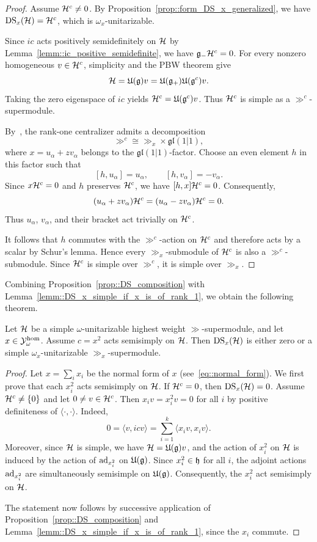 \begin{proof}
Assume ${\mathcal{H}}^c\neq0$. By Proposition~\ref{prop::form_DS_x_generalized}, we have $\operatorname{DS}_x({\mathcal{H}})={\mathcal{H}}^c$, which is $\omega_x$-unitarizable.

Since $ic$ acts positively semidefinitely on ${\mathcal{H}}$ by Lemma~\ref{lemm::ic_positive_semidefinite}, we have ${\mathfrak{g}}_-{\mathcal{H}}^{c}=0$. For every nonzero homogeneous $v\in {\mathcal{H}}^{c}$, simplicity and the PBW theorem give
\[
{\mathcal{H}}={\mathfrak U}({\mathfrak{g}})v
={\mathfrak U}({\mathfrak{g}}_+){\mathfrak U}({\mathfrak{g}}^c)v.
\]
Taking the zero eigenspace of $ic$ yields ${\mathcal{H}}^c={\mathfrak U}({\mathfrak{g}}^c)v$. Thus ${\mathcal{H}}^c$ is simple as a $\gg^c$-supermodule.

By~\cite[Theorem~3.12]{Sherman2025}, the rank-one centralizer admits a decomposition
\[
\gg^c\cong\gg_x\times\mathfrak{gl}(1\vert1),
\]
where $x=u_\alpha+zv_\alpha$ belongs to the
$\mathfrak{gl}(1\vert1)$-factor. Choose an even element
$h$ in this factor such that
\[
[h,u_\alpha]=u_\alpha,
\qquad
[h,v_\alpha]=-v_\alpha.
\]
Since $x{\mathcal{H}}^c=0$ and $h$ preserves ${\mathcal{H}}^c$, we have
$[h,x]{\mathcal{H}}^c=0$. Consequently,
\[
(u_\alpha+zv_\alpha){\mathcal{H}}^c
=
(u_\alpha-zv_\alpha){\mathcal{H}}^c=0.
\]
Thus $u_\alpha$, $v_\alpha$, and their bracket act
trivially on ${\mathcal{H}}^c$.

 
It follows that $h$ commutes with the $\gg^c$-action on ${\mathcal{H}}^c$ and therefore acts by a scalar by Schur's lemma. Hence every $\gg_x$-submodule
of ${\mathcal{H}}^c$ is also a $\gg^c$-submodule.
Since ${\mathcal{H}}^c$ is simple over $\gg^c$, it is simple
over $\gg_x$.
\end{proof}

Combining Proposition~\ref{prop::DS_composition} with Lemma~\ref{lemm::DS_x_simple_if_x_is_of_rank_1}, we obtain the following theorem.

\begin{theorem}\label{thm::DS_unitary}
    Let ${\mathcal{H}}$ be a simple $\omega$-unitarizable highest weight $\gg$-supermodule, and let $x \in {\mathcal Y}_{\omega}^{\hom}$. Assume $c=x^{2}$ acts semisimply on ${\mathcal{H}}$. Then $\operatorname{DS}_{x}({\mathcal{H}})$ is either zero or a simple $\omega_{x}$-unitarizable $\gg_{x}$-supermodule.
\end{theorem}


\begin{proof}

Let $x=\sum_i x_i$ be the normal form of $x$ (see~\eqref{eq::normal_form}). We first prove that each $x_{i}^{2}$ acts semisimply on ${\mathcal{H}}$. If ${\mathcal{H}}^c=0$, then $\operatorname{DS}_x({\mathcal{H}})=0$. Assume ${\mathcal{H}}^c\neq\{0\}$ and let $0\neq v\in{\mathcal{H}}^c$. Then $x_iv=x_i^2v=0$ for all $i$ by positive definiteness of $\langle\cdot,\cdot\rangle$. Indeed,
\[
0=\langle v,icv\rangle=\sum_{i=1}^k\langle x_iv,x_iv\rangle.
\]
Moreover, since ${\mathcal{H}}$ is simple, we have ${\mathcal{H}}={\mathfrak U}({\mathfrak{g}})v$, and the action of $x_i^2$ on ${\mathcal{H}}$ is induced by the action of $\operatorname{ad}_{x_i^2}$ on ${\mathfrak U}({\mathfrak{g}})$. 
Since $x_i^2\in{\mathfrak h}$ for all $i$, the adjoint actions $\operatorname{ad}_{x_i^2}$ are simultaneously semisimple on ${\mathfrak U}({\mathfrak{g}})$. Consequently, the $x_i^2$ act semisimply on ${\mathcal{H}}$.

The statement now follows by successive application of Proposition~\ref{prop::DS_composition} and Lemma~\ref{lemm::DS_x_simple_if_x_is_of_rank_1}, 
since the $x_i$ commute.
\end{proof}

